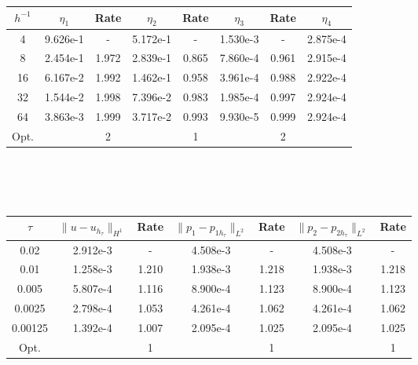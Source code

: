 \begin{center} 
\centering
\begin{tabular}{c|c|c|c|c|c|c|c}
$h^{-1}$ & $\eta_1$ & Rate &  $\eta_2$ & Rate & $\eta_3$ & Rate & $\eta_4$\\\hline
4  & 9.626e-1 & -     & 5.172e-1 & -     & 1.530e-3 & -     & 2.875e-4 \\
8  & 2.454e-1 & 1.972 & 2.839e-1 & 0.865 & 7.860e-4 & 0.961 & 2.915e-4 \\
16 & 6.167e-2 & 1.992 & 1.462e-1 & 0.958 & 3.961e-4 & 0.988 & 2.922e-4 \\
32 & 1.544e-2 & 1.998 & 7.396e-2 & 0.983 & 1.985e-4 & 0.997 & 2.924e-4 \\
64 & 3.863e-3 & 1.999 & 3.717e-2 & 0.993 & 9.930e-5 & 0.999 & 2.924e-4 \\\hline
Opt. & & 2 & & 1  & & 2 & 
\end{tabular}
 \label{tab:bb_no_transfer_space_est}
\end{center}
\mbox{}\\ \\ \\
\begin{center} 
\centering
\small
\begin{tabular}{c|c|c|c|c|c|c}
$\tau$ & $\|u-u_{h_{\tau}}\|_{H^1}$ & Rate & $\|p_1-p_{1h_{\tau}}\|_{L^2}$ & Rate & $\|p_2-p_{2h_{\tau}}\|_{L^2}$ & Rate \\\hline
0.02   	& 2.912e-3 & -     & 4.508e-3 & -     & 4.508e-3 &  -    \\
0.01   	& 1.258e-3 & 1.210 & 1.938e-3 & 1.218 & 1.938e-3 & 1.218 \\
0.005  	& 5.807e-4 & 1.116 & 8.900e-4 & 1.123 & 8.900e-4 & 1.123 \\
0.0025  & 2.798e-4 & 1.053 & 4.261e-4 & 1.062 & 4.261e-4 & 1.062 \\
0.00125 & 1.392e-4 & 1.007 & 2.095e-4 & 1.025 & 2.095e-4 & 1.025 \\ \hline
Opt. & & 1 & & 1  & & 1
\end{tabular}
\normalsize
{} \label{tab:bb_no_transfer_time_error}
\end{center}
